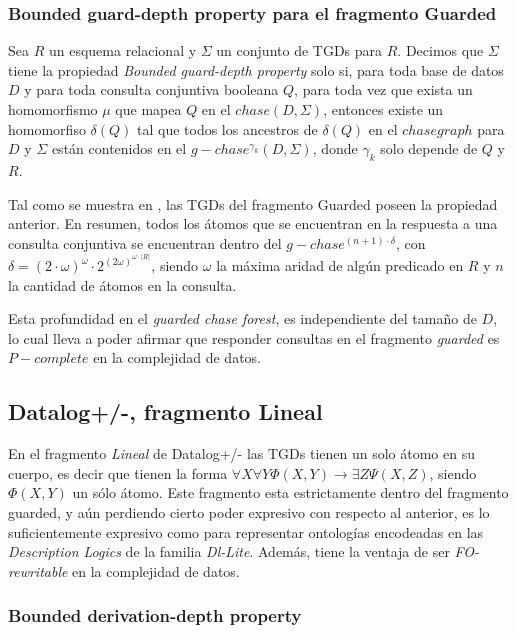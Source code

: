 \documentclass[11pt,a4paper,twoside]{tesis}
\begin{document}
\subsubsection{Bounded guard-depth property para el fragmento Guarded}

Sea $R$ un esquema relacional y $\Sigma$ un conjunto de TGDs para $R$. Decimos que $\Sigma$ tiene la propiedad \textit{Bounded guard-depth property} solo si, para toda base de datos $D$ y para toda consulta conjuntiva booleana $Q$, para toda vez que exista un homomorfismo $\mu$ que mapea $Q$ en el $chase(D, \Sigma)$, entonces existe un homomorfiso $\delta(Q)$ tal que todos los ancestros de $\delta(Q)$ en el $chase graph$ para $D$ y $\Sigma$ están contenidos en el $g-chase^{\gamma_k}(D, \Sigma)$, donde $\gamma_k$ solo depende de $Q$ y $R$.

Tal como se muestra en \cite{JWS}, las TGDs del fragmento Guarded poseen la propiedad anterior. En resumen, todos los átomos que se encuentran en la respuesta a una consulta conjuntiva se encuentran dentro del $g-chase^{(n + 1)\cdot\delta}$, con $\delta = (2\cdot\omega)^\omega\cdot2^{(2\omega)^{\omega\cdot|R|}}$, siendo $\omega$ la máxima aridad de algún predicado en $R$ y $n$ la cantidad de átomos en la consulta.

Esta profundidad en el \textit{guarded chase forest}, es independiente del tamaño de $D$, lo cual lleva a poder afirmar que responder consultas en el fragmento \textit{guarded} es $P-complete$ en la complejidad de datos.

\subsection{Datalog+/-, fragmento Lineal}

En el fragmento \textit{Lineal} de Datalog+/- las TGDs tienen un solo átomo en su cuerpo, es decir que tienen la forma $\forall X \forall  Y \Phi(X, Y) \rightarrow \exists Z \Psi(X,Z)$, siendo $\Phi(X,Y)$ un sólo átomo. Este fragmento esta estrictamente dentro del fragmento guarded, y aún perdiendo cierto poder expresivo con respecto al anterior, es lo suficientemente expresivo como para representar ontologías encodeadas en las \textit{Description Logics} de la familia \textit{Dl-Lite}. Además, tiene la ventaja de ser \textit{FO-rewritable} en la complejidad de datos.

\subsubsection{Bounded derivation-depth property}
\end{document}
